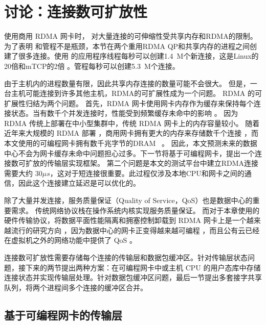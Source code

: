 \section{讨论：连接数可扩放性}
\label{socksdirect:sec:discussion}


使用商用 RDMA 网卡时，\sys {} 对大量连接的可伸缩性受共享内存和RDMA的限制。
为了表明 \libipc {} 和管程不是瓶颈，本节在两个重用RDMA QP和共享内存的进程之间创建了很多连接。使用 \libipc {} 的应用程序线程每秒可以创建1.4~M个新连接，这是Linux的20倍和mTCP的2倍 \cite {jeong2014mtcp}。管程每秒可以创建5.3~M个连接。

由于主机内的进程数量有限，因此共享内存连接的数量可能不会很大。
但是，一台主机可能连接到许多其他主机，RDMA的可扩展性成为一个问题。
RDMA 的可扩展性归结为两个问题。
首先，RDMA 网卡使用网卡内存作为缓存来保持每个连接状态。当有数千个并发连接时，性能受到频繁缓存未命中的影响 \cite {mprdma,kaminsky2016design,kalia2018datacenter}。
因为 RDMA 传统上部署在中小型集群中，传统 RDMA 网卡上的内存容量较小。
随着近年来大规模的 RDMA 部署 \cite {guo2016rdma}，商用网卡拥有更大的内存来存储数千个连接 \cite {kalia2018datacenter}，而本文使用的可编程网卡拥有数千兆字节的DRAM~ \cite {mellanox-innova,mellanox-bluefield,smartnic}。
因此，本文预测未来的数据中心不会为网卡缓存未命中问题担心过多。下一节将基于可编程网卡，提出一个连接数可扩放的传输层实现框架。
第二个问题是本文的测试平台中建立RDMA连接需要大约 $30 \mu s$，这对于短连接很重要。此过程仅涉及本地CPU和网卡之间的通信，因此这个连接建立延迟是可以优化的。

除了大量并发连接，服务质量保证（Quality of Service，QoS）也是数据中心的重要需求。
传统网络协议栈在操作系统内核实现服务质量保证。
而对于本章使用的硬件传输协议，将数据平面性能隔离和拥塞控制卸载到 RDMA 网卡上是一个越来越流行的研究方向 \cite {peter2016arrakis,zhu2015congestion,lu2017memory,mprdma,mittal2018revisiting}，因为数据中心的网卡正变得越来越可编程  \cite{smartnic,cavium,kaufmann2015flexnic,mellanox-innova,mellanox-bluefield}，而且公有云已经在虚拟机之外的网络功能中提供了 QoS \cite {li2016clicknp,panda2016netbricks,floem-osdi18}。

连接数可扩放性需要存储每个连接的传输层和数据包缓冲区。针对传输层状态问题，接下来的两节提出两种方案：在可编程网卡中或主机 CPU 的用户态库中存储连接状态并实现传输层处理。针对数据包缓冲区问题，最后一节提出多套接字共享队列，将两个进程间多个连接的缓冲区合并。

\subsection{基于可编程网卡的传输层}
\label{socksdirect:sec:smartnic}

